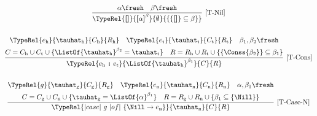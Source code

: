 \begin{figure}[h!t]
\begin{gather*}
\frac
    {\alpha \fresh  \quad  \beta \fresh}
    {\TypeRel{\textbf{[]}}{\textbf{[}\alpha\textbf{]}^\beta}{\emptyset}{\{\{\textbf{[]}\}\subseteq\beta\}}}
    \mbox{\ [T-Nil]}\\ \\ %
\frac
    {\begin{gathered}\TypeRel{e_\mathrm{h}}{\tauhat_\mathrm{h}}{C_\mathrm{h}}{R_\mathrm{h}} \quad \TypeRel{e_\mathrm{t}}{\tauhat_\mathrm{t}}{C_\mathrm{t}}{R_\mathrm{t}} \quad \beta_1, \beta_2 \fresh\\C = C_\mathrm{h} \cup C_\mathrm{t} \cup \{\ListOf{\tauhat_\mathrm{h}}^{\beta_2} = \tauhat_\mathrm{t}\}\quad R = R_\mathrm{h} \cup R_\mathrm{t} \cup \{ \{\Conss{\beta_2}\} \subseteq \beta_1 \}\end{gathered}}
    {\TypeRel{e_\mathrm{h} \textbf{\ :\ } e_\mathrm{t}}{\ListOf{\tauhat_\mathrm{h}}^{\beta_1}}{C}{R}}
    \mbox{\ [T-Cons]}\\ \\  %
\frac
    {\begin{gathered}\TypeRel{g}{\tauhat_\mathrm{g}}{C_\mathrm{g}}{R_\mathrm{g}}\quad \TypeRel{e_\mathrm{n}}{\tauhat_\mathrm{n}}{C_\mathrm{n}}{R_\mathrm{n}} \quad \alpha, \beta_1 \fresh \\ C = C_\mathrm{g} \cup C_\mathrm{n}\cup \{\tauhat_\mathrm{g} = \ListOf{\alpha}^{\beta_1}\} \quad R = R_\mathrm{g} \cup R_\mathrm{n} \cup \{ \beta_1 \subseteq \{\Nill\} \}\end{gathered}}
    {\TypeRel{|case|\ g\ |of|\ \{ \Nill \to e_\mathrm{n}\}}{\tauhat_\mathrm{n}}{C}{R}}
    \mbox{\ [T-Case-N]}\\ \\

\end{gather*}
\end{figure}
